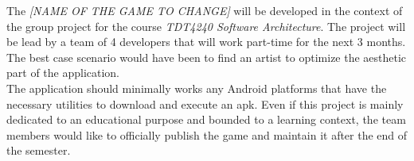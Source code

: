 The \textit{[NAME OF THE GAME TO CHANGE]} will be developed in the context of the group project for the course \textit{TDT4240 Software Architecture}. The project will be lead by a team of 4 developers that will work part-time for the next 3 months. The best case scenario would have been to find an artist to optimize the aesthetic part of the application. \\

The application should minimally works any Android platforms that have the necessary utilities to download and execute an \gls{apk}. Even if this project is mainly dedicated to an educational purpose and bounded to a learning context, the team members would like to officially publish the game and maintain it after the end of the semester.

